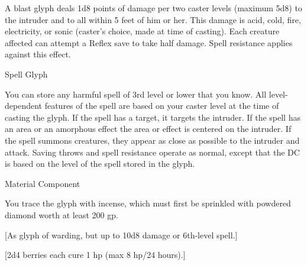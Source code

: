 {	A blast glyph deals 1d8 points of damage per two caster levels (maximum 5d8) to the intruder and to all within 5 feet of him or her. This damage is acid, cold, fire, electricity, or sonic (caster's choice, made at time of casting). Each creature affected can attempt a Reflex save to take half damage. Spell resistance applies against this effect.

Spell Glyph

	You can store any harmful spell of 3rd level or lower that you know. All level-dependent features of the spell are based on your caster level at the time of casting the glyph. If the spell has a target, it targets the intruder. If the spell has an area or an amorphous effect the area or effect is centered on the intruder. If the spell summons creatures, they appear as close as possible to the intruder and attack. Saving throws and spell resistance operate as normal, except that the DC is based on the level of the spell stored in the glyph.

Material Component

	You trace the glyph with incense, which must first be sprinkled with powdered diamond worth at least 200 gp.
}
        
[As glyph of warding, but up to 10d8 damage or 6th-level spell.]
        
[2d4 berries each cure 1 hp (max 8 hp/24 hours).]
        
